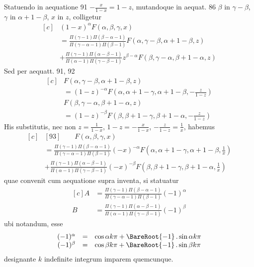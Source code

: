 Statuendo in aequatione 91 \(-\frac{x}{1-x}=1-z\), mutandoque in aequat. 86
\(\beta\) in \(\gamma-\beta\), \(\gamma\) in \(\alpha+1-\beta\), \(x\) in \(z\), colligetur
\[
\begin{aligned}[c]
&(1-x)^\alpha F(\alpha,\beta,\gamma,x)\\&=
\frac{\Pi(\gamma-1)\Pi(\beta-\alpha-1)}{\Pi(\gamma-\alpha-1)\Pi(\beta-1)}F(\alpha,\gamma-\beta,\alpha+1-\beta,z)\\
&+\frac{\Pi(\gamma-1)\Pi(\alpha-\beta-1)}{\Pi(\alpha-1)\Pi(\gamma-\beta-1)}z^{\beta-\alpha}F(\beta,\gamma-\alpha,\beta+1-\alpha,z)
\end{aligned}
\]
Sed per aequatt. 91, 92
\[
\begin{aligned}[c]
&F(\alpha,\gamma-\beta,\alpha+1-\beta,z)\\&=(1-z)^{-\alpha}F\left(\alpha,\alpha+1-\gamma,\alpha+1-\beta,-\frac{z}{1-z}\right)\\[5pt]
&F(\beta,\gamma-\alpha,\beta+1-\alpha,z)\\&=(1-z)^{-\beta}F\left(\beta,\beta+1-\gamma,\beta+1-\alpha,-\frac{z}{1-z}\right)
\end{aligned}
\]
His substitutis, nec non \(z=\frac{1}{1-x}\), \(1-z=-\frac{x}{1-x}\), \(-\frac{z}{1-z}=\frac{1}{x}\), habemus
\[
\begin{aligned}[c]
&[93]\qquad F(\alpha,\beta,\gamma,x)\\&=
\frac{\Pi(\gamma-1)\Pi(\beta-\alpha-1)}{\Pi(\gamma-\alpha-1)\Pi(\beta-1)}(-x)^{-\alpha}F\left(\alpha,\alpha+1-\gamma,\alpha+1-\beta,\frac{1}{x}\right)\\
&+\frac{\Pi(\gamma-1)\Pi(\alpha-\beta-1)}{\Pi(\alpha-1)\Pi(\gamma-\beta-1)}(-x)^{-\beta}F\left(\beta,\beta+1-\gamma,\beta+1-\alpha,\frac{1}{x}\right)
\end{aligned}
\]
quae convenit cum aequatione supra inventa, si statuatur
\[
\begin{aligned}[c]
A&=\frac{\Pi(\gamma-1)\Pi(\beta-\alpha-1)}{\Pi(\gamma-\alpha-1)\Pi(\beta-1)}(-1)^\alpha\\
B&=\frac{\Pi(\gamma-1)\Pi(\alpha-\beta-1)}{\Pi(\alpha-1)\Pi(\gamma-\beta-1)}(-1)^\beta
\end{aligned}
\]
ubi notandum, esse
\[
\begin{array}{rcl}
(-1)^\alpha&=&\cos\alpha k\pi+\BareRoot{-1}\,.\sin\alpha k\pi\\
(-1)^\beta&=&\cos\beta k\pi+\BareRoot{-1}\,.\sin\beta k\pi
\end{array}
\]
designante \(k\) indefinite integrum imparem quemcunque.

